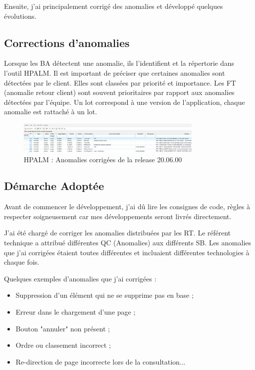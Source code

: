 Ensuite, j'ai principalement corrigé des anomalies et développé quelques évolutions.

\subsection{Corrections d'anomalies}

Lorsque les BA détectent une anomalie, ils l'identifient et la répertorie dans l'outil HPALM. Il est important de préciser que certaines anomalies sont détectées par le client. Elles sont classées par priorité et importance.
Les FT (anomalie retour client) sont souvent prioritaires par rapport aux anomalies détectées par l'équipe.
Un lot correspond à une version de l'application, chaque anomalie est rattaché à un lot.

\begin{figure}[h]
\centering
\includegraphics[width=0.8\textwidth]{images/HPLMliste.png}
\caption{HPALM : Anomalies corrigées de la release 20.06.00}
\end{figure}

\subsection{Démarche Adoptée}

Avant de commencer le développement, j'ai dû lire les consignes de code, règles à respecter soigneusement car mes développements seront livrés directement.

J'ai été chargé de corriger les anomalies distribuées par les RT.
Le référent technique a attribué différentes QC (Anomalies) aux différents SB. 
Les anomalies que j'ai corrigées étaient toutes différentes et incluaient différentes technologies à chaque fois.

Quelques exemples d'anomalies que j'ai corrigées : 
\begin{itemize}
    \item Suppression d'un élément qui ne se supprime pas en base ;
    \item Erreur dans le chargement d'une page ;
    \item Bouton "annuler" non présent ;
    \item Ordre ou classement incorrect ;
    \item Re-direction de page incorrecte lors de la consultation...
\end{itemize}


